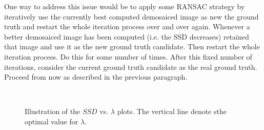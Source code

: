 \documentclass{paper}
\begin{document}
One way to address this issue would be to apply some RANSAC strategy by iteratively use the currently best computed demosaiced image as new the ground truth and restart the whole iteration process over and over again. Whenever a better demosaiced image has been computed (i.e. the SSD decreases) retained that image and use it as the new ground truth candidate. Then restart the whole iteration process. Do this for some number of times. After this fixed number of iterations, consider the current ground truth candidate as the real ground truth. Proceed from now as described in the previous paragraph.     

\begin{figure}[H]
\begin{center}
~
\end{center}
\caption{Illustration of the $SSD$ vs. $\lambda$ plots. The vertical line denote sthe optimal value for $\lambda$.}
\label{fig:ssd_lambda_plots}
\end{figure}
\end{document}

